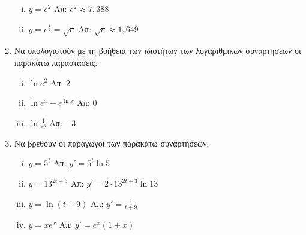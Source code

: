 \begin{enumerate}
    \begin{enumerate}[i)]
      \item $ y=e^{2} $ \hfill Απ: $ e^{2} \approx 7,388 $ 
      \item $ y=e^{\frac{1}{2}}= \sqrt{e} $ \hfill Απ: $ \sqrt{e} \approx 1,649 $ 
    \end{enumerate}

  \item Να υπολογιστούν με τη βοήθεια των ιδιοτήτων των λογαριθμικών συναρτήσεων οι 
    παρακάτω παραστάσεις.

    \begin{enumerate}[i)]
      \item $ \ln{e^{2}} $ \hfill Απ: $ 2 $ 
      \item $ \ln{e^{x}} - e^{\ln{x}} $ \hfill Απ: $ 0  $ 
      \item $ \ln{\frac{1}{e^{3}}} $ \hfill Απ: $ -3 $ 
    \end{enumerate}


  \item Να βρεθούν οι παράγωγοι των παρακάτω συναρτήσεων.

    \begin{enumerate}[i)]
      \item $ y = 5^{t} $ \hfill Απ: $ y'=5^{t} \ln{5} $
      \item $ y = 13^{2t+3} $ \hfill Απ: $ y' = 2\cdot 13^{2t+3} \ln{13}  $ 
      \item $ y = \ln{(t+9)} $ \hfill Απ: $y'= \frac{1}{t+9} $
      \item $ y = xe^{x} $ \hfill Απ: $ y'=e^{x}(1+x) $ 
    \end{enumerate}
\end{enumerate}


  
